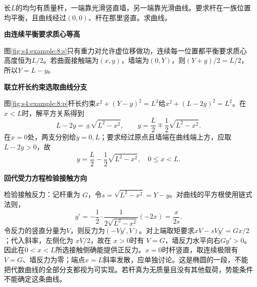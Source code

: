 \begin{question}\begin{example}[任意位置平衡的支承曲线]\label{s4:example:8}
长$L$的均匀有质量杆，一端靠光滑竖直墙，另一端靠光滑曲线。要求杆在一族位置均平衡，且曲线经过$(0,0)$、杆在那里竖直。求曲线。
\end{example}
\end{question}
\begin{solution}\textbf{由连续平衡要求质心等高}\par\nobreak
图\ref{fig:s4:example:8:s}只有重力对允许虚位移做功，连续每一位置都平衡要求质心高度恒为$L/2$。若曲面接触端为$(x,y)$，墙端为$(0,Y)$，则$(Y+y)/2=L/2$，所以$Y=L-y$。



\par\medskip{}\noindent\textbf{联立杆长约束选取曲线分支}\par\nobreak
图\ref{fig:s4:example:8:p}杆长约束$x^2+(Y-y)^2=L^2$给$x^2+(L-2y)^2=L^2$。在$x<L$时，解平方关系得到
\[
L-2y=\pm\sqrt{L^2-x^2},\qquad
y=\frac L2\mp\frac12\sqrt{L^2-x^2}.
\]
在$x=0$处，两支分别给$y=0,L$；要求经过原点且墙端在曲线端上方，应取$L-2y>0$，故
\[
y=\frac L2-\frac12\sqrt{L^2-x^2},\quad 0\le x<L.
\]


\par\medskip{}\noindent\textbf{回代受力方程检验接触方向}\par\nobreak
检验接触反力：记杆重为 $G$，令$s=\sqrt{L^2-x^2}=Y-y$。对曲线的平方根使用链式法则，
\[y'=-\frac12\cdot\frac{1}{2\sqrt{L^2-x^2}}(-2x)=\frac{x}{2s}.\]
令反力的竖直分量为$V$，则反力为$(-Vy',V)$。对上端取矩要求$xV-sVy'=Gx/2$；代入斜率，左侧化为 $xV/2$，故在 $x>0$时有 $V=G$，墙反力水平向右$Gy'>0$。因此在$0<x<L$所选接触侧确能提供正反力。$x=0$时杆竖直，取连续极限有 $V=G$、墙反力为零；端点$x=L$斜率发散，应单独讨论。这是椭圆的一段，不能把代数曲线的全部分支都视为可实现。若杆真为无质量且没有其他载荷，势能条件不能确定这条曲线。\end{solution}
